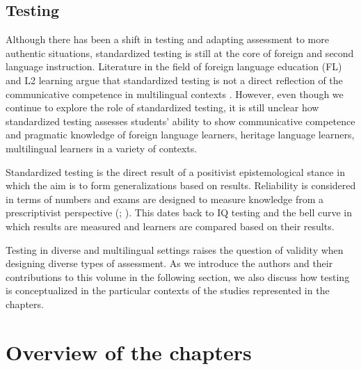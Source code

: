 \documentclass[output=paper]{langscibook}
\begin{document}
\subsection{Testing}



Although there has been a shift in testing and adapting assessment to more authentic situations, standardized testing is still at the core of foreign and second language instruction. Literature in the field of foreign language education (FL) and L2 learning argue that standardized testing is not a direct reflection of the communicative competence in multilingual contexts \citep{Brown2010}. However, even though we continue to explore the role of standardized testing, it is still unclear how standardized testing assesses students’ ability to show communicative competence and pragmatic knowledge of foreign language learners, heritage language learners, multilingual learners in a variety of contexts.



Standardized testing is the direct result of a positivist epistemological stance in which the aim is to form generalizations based on results. Reliability is considered in terms of numbers and exams are designed to measure knowledge from a prescriptivist perspective (\citealt{Ortega2017}; \citealt{MenkeMalovhr2021}). This dates back to IQ testing and the bell curve in which results are measured and learners are compared based on their results.



Testing in diverse and multilingual settings raises the question of validity when designing diverse types of assessment. As we introduce the authors and their contributions to this volume in the following section, we also discuss how testing is conceptualized in the particular contexts of the studies represented in the chapters.


\section{Overview of the chapters}
\end{document}

